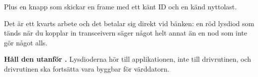 Plus en knapp som skickar en frame med ett känt ID och en känd nyttolast.

Det är ett kvarts arbete och det betalar sig direkt vid bänken: en röd lysdiod som tänds när du
kopplar in transceivern säger något helt annat än en nod som inte gör något alls.

\textbf{Håll den utanför .} Lysdioderna hör till applikationen, inte till
drivrutinen, och drivrutinen ska fortsätta vara byggbar för värddatorn.
